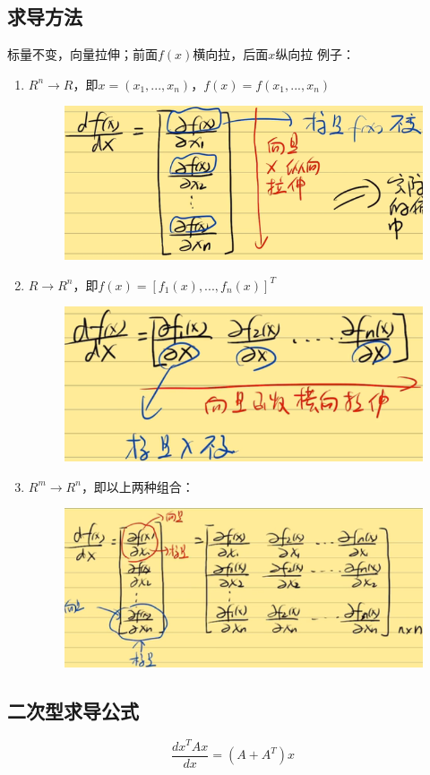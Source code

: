 \documentclass[AutoFakeBold]{MyFormat}
\begin{document}
\subsection{求导方法}
\par 标量不变，向量拉伸；前面$f(x)$横向拉，后面$x$纵向拉
例子：
\begin{enumerate}
    \item $R^n \to R$，即$x = (x_1, ..., x_n)$，$f(x)=f(x_1, ..., x_n)$
    \begin{figure}[!h]
        \centering
        \includegraphics[width=0.4\linewidth]{figures/2022.05.24/pic13.png}
    \end{figure}
    \item $R \to R^n$，即$f(x)=[f_1(x), ..., f_n(x)]^T$
    \begin{figure}[!h]
        \centering
        \includegraphics[width=0.4\linewidth]{figures/2022.05.24/pic14.png}
    \end{figure}
    \item $R^m \to R^n$，即以上两种组合：
    \begin{figure}[!h]
        \centering
        \includegraphics[width=0.4\linewidth]{figures/2022.05.24/pic15.png}
    \end{figure}
\end{enumerate}

\subsection{二次型求导公式}
\begin{equation}
    \frac{dx^TAx}{dx}=(A+A^T)x
\end{equation}


\end{document}
